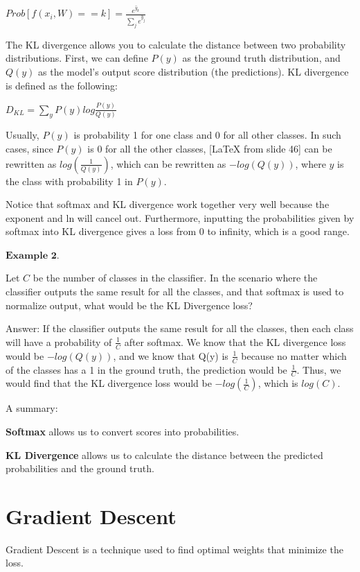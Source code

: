\documentclass{article}
\begin{document}
$Prob[f(x_i, W) == k] = \frac{e^{\hat{y}_k}}{\sum_{j}e^{\hat{y}_j}}$

The KL divergence allows you to calculate the distance between two probability distributions. First, we can define $P(y)$ as the ground truth distribution, and $Q(y)$ as the model’s output score distribution (the predictions). KL divergence is defined as the following:

$D_{KL} = \sum_{y}^{} P(y)log\frac{P(y)}{Q(y)}$

Usually, $P(y)$ is probability 1 for one class and 0 for all other classes. In such cases, since $P(y)$ is 0 for all the other classes, [LaTeX from slide 46] can be rewritten as $log (\frac{1}{Q(y)})$, which can be rewritten as $-log(Q(y))$, where $y$ is the class with probability 1 in $P(y)$. 

Notice that softmax and KL divergence work together very well because the exponent and ln will cancel out. Furthermore, inputting the probabilities given by softmax into KL divergence gives a loss from 0 to infinity, which is a good range.

\bigskip

$\textbf{Example 2.}$

Let $C$ be the number of classes in the classifier. In the scenario where the classifier outputs the same result for all the classes, and that softmax is used to normalize output, what would be the KL Divergence loss?

Answer: If the classifier outputs the same result for all the classes, then each class will have a probability of $\frac{1}{C}$ after softmax. We know that the KL divergence loss would be $-log(Q(y))$, and we know that Q(y) is $\frac{1}{C}$ because no matter which of the classes has a 1 in the ground truth, the prediction would be $\frac{1}{C}$. Thus, we would find that the KL divergence loss would be $-log(\frac{1}{C})$, which is $log(C)$.

\bigskip

A summary:

\textbf{Softmax} allows us to convert scores into probabilities.

\textbf{KL Divergence} allows us to calculate the distance between the predicted probabilities and the ground truth.


\section{Gradient Descent}

Gradient Descent is a technique used to find optimal weights that minimize the loss. 
\end{document}
